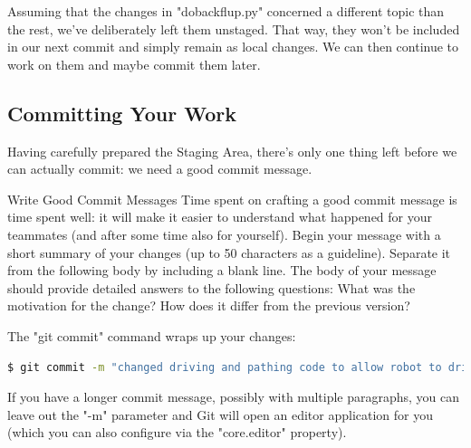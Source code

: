 \documentclass{article}
\begin{document}
Assuming that the changes in "dobackflup.py" concerned a different topic than the rest, we've deliberately left them unstaged. That way, they won't be included in our next commit and simply remain as local changes. We can then continue to work on them and maybe commit them later.
\subsection{Committing Your Work}
Having carefully prepared the Staging Area, there's only one thing left before we can actually commit: we need a good commit message.
\begin{golden-rule}Write Good Commit Messages
\newline\newline
Time spent on crafting a good commit message is time spent well: it will make it easier to understand what happened for your teammates (and after some time also for yourself).
\newline\newline
Begin your message with a short summary of your changes (up to 50 characters as a guideline). Separate it from the following body by including a blank line. The body of your message should provide detailed answers to the following questions: What was the motivation for the change? How does it differ from the previous version?
\end{golden-rule}

The "git commit" command wraps up your changes:
\begin{lstlisting}[language=bash]
$ git commit -m "changed driving and pathing code to allow robot to drive off table"
\end{lstlisting}

If you have a longer commit message, possibly with multiple paragraphs, you can leave out the "-m" parameter and Git will open an editor application for you (which you can also configure via the "core.editor" property).
\end{document}
